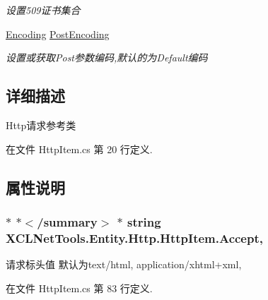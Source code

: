 \begin{DoxyCompactItemize}
\begin{DoxyCompactList}\small\item\em 设置509证书集合 \end{DoxyCompactList}\item 
\hyperlink{class_x_c_l_net_tools_1_1_entity_1_1_http_1_1_http_item_aefaad52c96c7c2b692f3470b61cd75eb}{Encoding} \hyperlink{class_x_c_l_net_tools_1_1_entity_1_1_http_1_1_http_item_ab4d3010b05811df9360aa8651d02302a}{Post\-Encoding}
\begin{DoxyCompactList}\small\item\em 设置或获取\-Post参数编码,默认的为\-Default编码 \end{DoxyCompactList}\end{DoxyCompactItemize}


\subsection{详细描述}
Http请求参考类 



在文件 Http\-Item.\-cs 第 20 行定义.



\subsection{属性说明}
\hypertarget{class_x_c_l_net_tools_1_1_entity_1_1_http_1_1_http_item_a1e43938a270466cf6955b4e161cf25fc}{
\subsubsection[{Accept}]{\setlength{\rightskip}{0pt plus 5cm}$\ast$ $\ast$$<$/summary$>$ $\ast$ string X\-C\-L\-Net\-Tools.\-Entity.\-Http.\-Http\-Item.\-Accept\hspace{0.3cm}{\ttfamily [get]}, {\ttfamily [set]}}}\label{class_x_c_l_net_tools_1_1_entity_1_1_http_1_1_http_item_a1e43938a270466cf6955b4e161cf25fc}


请求标头值 默认为text/html, application/xhtml+xml, 



在文件 Http\-Item.\-cs 第 83 行定义.

